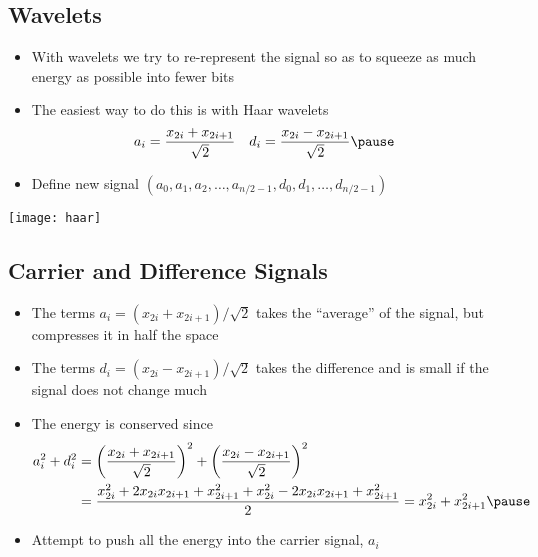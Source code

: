 
\begin{slide}
\section[-2.5]{Wavelets}

\begin{PauseHighLight}
  \begin{itemize}
  \item With wavelets we try to re-represent the signal so as to squeeze
    as much energy as possible into fewer bits\pause
  \item The easiest way to do this is with Haar wavelets
    \begin{align*}
      a_i &= \frac{x_{2i} + x_{2i+1}}{\sqrt{2}} &
      d_i &= \frac{x_{2i} - x_{2i+1}}{\sqrt{2}}\pause
    \end{align*}
  \item Define new signal $(a_0, a_1, a_2, \ldots, a_{n/2-1}, d_0, d_1,
    \ldots, d_{n/2-1})$
  \end{itemize}
  \begin{center}
    \texttt{[image: haar]}\pause   
  \end{center}
\end{PauseHighLight}

\end{slide}


\begin{slide}
\section[-2]{Carrier and Difference Signals}

\begin{PauseHighLight}
  \begin{itemize}
  \item The terms $a_i = (x_{2i} + x_{2i+1})/\sqrt{2}$ takes the
    ``average'' of the signal, but compresses it in half the space\pause
  \item The terms $d_i = (x_{2i} - x_{2i+1})/\sqrt{2}$ takes the
    difference and is small if the signal does not change much\pause
  \item The energy is conserved since 
    {\small
      \begin{align*}
        a_i^2 + d_i^2 &= \left(\frac{x_{2i} + x_{2i+1}}{\sqrt{2}}\right)^2
        + \left(\frac{x_{2i} - x_{2i+1}}{\sqrt{2}}\right)^2 \\
        &= \frac{x_{2i}^2 + 2 x_{2i}x_{2i+1} + x_{2i+1}^2 + x_{2i}^2 - 2
          x_{2i}x_{2i+1} + x_{2i+1}^2}{2} = x_{2i}^2 + x_{2i+1}^2\pause
      \end{align*}}
  \item Attempt to push all the energy into the carrier signal, $a_i$\pause
  \end{itemize}
\end{PauseHighLight}

\end{slide}

